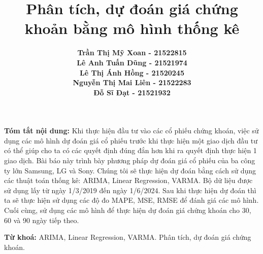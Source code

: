 \documentclass{article}
\begin{document}
\title{Phân tích, dự đoán giá chứng khoản bằng mô hình thống kê}
\author{
  \begin{tabular}{l}
    \textbf{Trần Thị Mỹ Xoan - 21522815 } \\
    \textbf{Lê Anh Tuấn Dũng - 21521974} \\
    \textbf{Lê Thị Ánh Hồng - 21520245} \\
    \textbf{Nguyễn Thị Mai Liên - 21522283} \\
    \textbf{Đỗ Sĩ Đạt - 21521932}
  \end{tabular}
}




\maketitle


\textbf{Tóm tắt nội dung:}
Khi thực hiện đầu tư vào các cổ phiếu chứng khoán, việc sử dụng các mô hình dự đoán giá cổ phiếu trước khi thực hiện một giao dịch đầu tư có thể giúp cho ta có các quyết định đúng đắn hơn khi ra quyết định thực hiện 1 giao dịch. Bài báo này trình bày phương pháp dự đoán giá cổ phiếu của ba công ty lớn Samsung, LG và Sony. Chúng tôi sẽ thực hiện dự đoán bằng cách sử dụng các thuật toán thống kê: ARIMA, Linear Regression, VARMA. Bộ dữ liệu được sử dụng lấy từ ngày 1/3/2019 đến ngày 1/6/2024. Sau khi thực hiện dự đoán thì ta sẽ thực hiện sử dụng các độ đo MAPE, MSE, RMSE để đánh giá các mô hình. Cuối cùng, sử dụng các mô hình để thực hiện dự đoán giá chứng khoán cho 30, 60 và 90 ngày tiếp theo.


\vspace{1em} %


\textbf{Từ khoá:} ARIMA, Linear Regression, VARMA. Phân tích, dự đoán giá chứng khoán.
\end{document}
